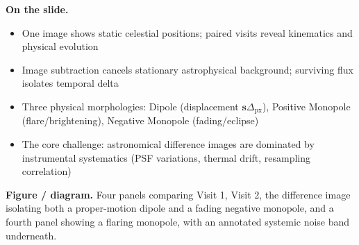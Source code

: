 \documentclass[11pt,a4paper]{article}
\begin{document}
\textbf{On the slide.}
\begin{itemize}[leftmargin=1.4em,itemsep=1.5pt,topsep=1.5pt]
\item One image shows static celestial positions; paired visits reveal kinematics and physical evolution
\item Image subtraction cancels stationary astrophysical background; surviving flux isolates temporal delta
\item Three physical morphologies: Dipole (displacement $\mathbf{s}\Delta_{\mathrm{px}}$), Positive Monopole (flare/brightening), Negative Monopole (fading/eclipse)
\item The core challenge: astronomical difference images are dominated by instrumental systematics (PSF variations, thermal drift, resampling correlation)
\end{itemize}

\textbf{Figure / diagram.} Four panels comparing Visit 1, Visit 2, the difference image isolating both a proper-motion dipole and a fading negative monopole, and a fourth panel showing a flaring monopole, with an annotated systemic noise band underneath.
\end{document}
